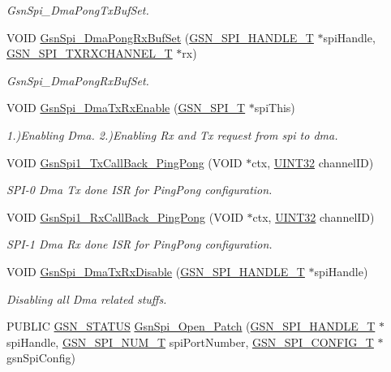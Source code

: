 \begin{DoxyCompactItemize}
\begin{DoxyCompactList}\small\item\em GsnSpi\_\-DmaPongTxBufSet. \end{DoxyCompactList}\item 
VOID \hyperlink{a00655_ga67638cf09d337fe02b6987dde904af5e}{GsnSpi\_\-DmaPongRxBufSet} (\hyperlink{a00238}{GSN\_\-SPI\_\-HANDLE\_\-T} $\ast$spiHandle, \hyperlink{a00241}{GSN\_\-SPI\_\-TXRXCHANNEL\_\-T} $\ast$rx)
\begin{DoxyCompactList}\small\item\em GsnSpi\_\-DmaPongRxBufSet. \end{DoxyCompactList}\item 
VOID \hyperlink{a00655_ga78b8fecdc2cd5a6696de7b0969572670}{GsnSpi\_\-DmaTxRxEnable} (\hyperlink{a00230}{GSN\_\-SPI\_\-T} $\ast$spiThis)
\begin{DoxyCompactList}\small\item\em 1.)Enabling Dma. 2.)Enabling Rx and Tx request from spi to dma. \end{DoxyCompactList}\item 
VOID \hyperlink{a00655_ga5aad26534270bea0b8fa13834ef568e2}{GsnSpi1\_\-TxCallBack\_\-PingPong} (VOID $\ast$ctx, \hyperlink{a00660_gae1e6edbbc26d6fbc71a90190d0266018}{UINT32} channelID)
\begin{DoxyCompactList}\small\item\em SPI-\/0 Dma Tx done ISR for PingPong configuration. \end{DoxyCompactList}\item 
VOID \hyperlink{a00655_gad380e1dfec5929d457d5e64153229d14}{GsnSpi1\_\-RxCallBack\_\-PingPong} (VOID $\ast$ctx, \hyperlink{a00660_gae1e6edbbc26d6fbc71a90190d0266018}{UINT32} channelID)
\begin{DoxyCompactList}\small\item\em SPI-\/1 Dma Rx done ISR for PingPong configuration. \end{DoxyCompactList}\item 
VOID \hyperlink{a00655_ga66aa235e1a4eef449cdcf4e4e0d51730}{GsnSpi\_\-DmaTxRxDisable} (\hyperlink{a00238}{GSN\_\-SPI\_\-HANDLE\_\-T} $\ast$spiHandle)
\begin{DoxyCompactList}\small\item\em Disabling all Dma related stuffs. \end{DoxyCompactList}\item 
PUBLIC \hyperlink{a00660_gada5951904ac6110b1fa95e51a9ddc217}{GSN\_\-STATUS} \hyperlink{a00655_ga96438fab641da9e6b7d5ac42efb0a06a}{GsnSpi\_\-Open\_\-Patch} (\hyperlink{a00238}{GSN\_\-SPI\_\-HANDLE\_\-T} $\ast$spiHandle, \hyperlink{a00587_a8158d263babcdfe1b3b113e23acd1bf7}{GSN\_\-SPI\_\-NUM\_\-T} spiPortNumber, \hyperlink{a00231}{GSN\_\-SPI\_\-CONFIG\_\-T} $\ast$gsnSpiConfig)

\end{DoxyCompactItemize}
